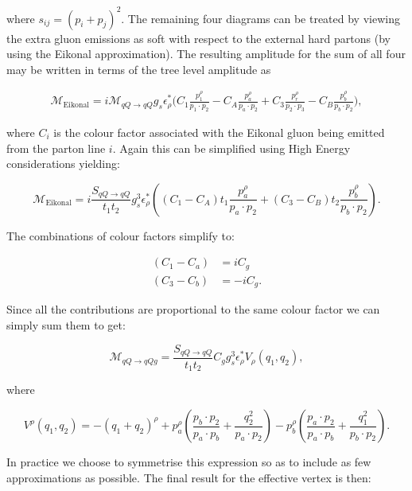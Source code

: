 		where $s_{ij} = (p_i + p_j)^2$.  The remaining four diagrams can be treated by viewing the extra gluon emissions as soft with
		respect to the external hard partons (by using the Eikonal approximation).  The resulting
		amplitude for the sum of all four may be written in terms of the tree level amplitude as

		\begin{align}
			\mathcal{M}_{\text{Eikonal}} = i\mathcal{M}_{qQ\rightarrow qQ}g_s\epsilon^*_\rho
			\Big(C_1\frac{p_1^\rho}{p_1\cdot p_2} - C_A\frac{p_a^\rho}{p_a\cdot p_2}
			+ C_3\frac{p_r^\rho}{p_2\cdot p_3} - C_B\frac{p_b^\rho}{p_b\cdot p_2}\Big),
		\end{align}

		where $C_i$ is the colour factor associated with the Eikonal gluon being emitted from the
		parton line $i$.  Again this can be simplified using High Energy considerations yielding:

		\begin{equation}
			\mathcal{M}_{\text{Eikonal}} = i\frac{S_{qQ\rightarrow qQ}}{t_1t_2}g_s^3\epsilon^*_\rho
			\left((C_1-C_A)t_1\frac{p_a^\rho}{p_a\cdot p_2} + (C_3-C_B)t_2\frac{p_b^\rho}{p_b\cdot p_2}\right).
		\end{equation}

		The combinations of colour factors simplify to:

		\begin{align}
			(C_1 - C_a) &=  iC_g \\
			(C_3 - C_b) &= -iC_g.
		\end{align}

		Since all the contributions are proportional to the same colour factor we can simply sum
		them to get:

		\begin{equation}
			\mathcal{M}_{qQ\rightarrow qQg} = \frac{S_{qQ\rightarrow qQ}}{t_1t_2}C_gg_s^3\epsilon^*_\rho V_\rho(q_1, q_2),
		\end{equation}

		where

		\begin{equation}
			V^\rho(q_1, q_2) = -(q_1 + q_2)^\rho +
			p_a^\rho\left(\frac{p_b\cdot p_2}{p_a\cdot p_b} + \frac{q^2_2}{p_a\cdot p_2}\right) -
			p_b^\rho\left(\frac{p_a\cdot p_2}{p_a\cdot p_b} + \frac{q^2_1}{p_b\cdot p_2}\right).
			\label{eqn:unsymm}
		\end{equation}

		In practice we choose to symmetrise this expression so as to include as few
		approximations as possible.  The final result for the effective vertex is then:


